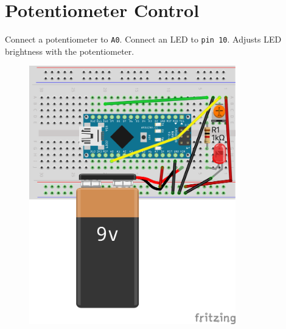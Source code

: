 \documentclass{article}
\begin{document}
\section*{Potentiometer Control}
\begin{minipage}{\textwidth}
Connect a potentiometer to \texttt{A0}. Connect an LED to \texttt{pin 10}. Adjusts LED brightness with the potentiometer.
\end{minipage}
\begin{figure}[h!]
\centering
\includegraphics[width=0.8\textwidth]{potent_nano_bb.png}
\end{figure}
\newpage
\newpage
\end{document}
